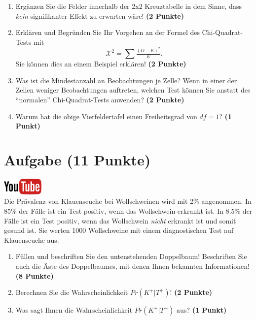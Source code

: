 \documentclass[a4paper, 10pt]{scrartcl}\usepackage[]{graphicx}\usepackage[]{xcolor}
\begin{document}
\begin{enumerate}
\item Erg{\"a}nzen Sie die Felder innerhalb der 2x2 Kreuztabelle in dem Sinne,
  dass \textit{kein} signifikanter Effekt zu erwarten w{\"a}re!
  \textbf{(2 Punkte)}
\item Erkl{\"a}ren und Begr{\"u}nden Sie Ihr Vorgehen an der Formel des
  Chi-Quadrat-Tests mit
  \begin{equation*}
  \mathcal{X}^2 = \sum\tfrac{(O - E)^2}{E}.  
  \end{equation*}
  Sie k{\"o}nnen dies an einem Beispiel erkl{\"a}ren! \textbf{(2 Punkte)}
\item Was ist die Mindestanzahl an Beobachtungen je Zelle? Wenn in einer
  der Zellen weniger Beobachtungen auftreten, welchen Test k{\"o}nnen Sie
  anstatt des "`normalen"' Chi-Quadrat-Tests anwenden? \textbf{(2 Punkte)}
\item Warum hat die obige Vierfeldertafel einen Freiheitsgrad von $df=1$?
  \textbf{(1 Punkt)}
\end{enumerate} 
\clearpage

\section{Aufgabe \hfill (11 Punkte)}

\hfill\href{https://youtu.be/VQlNl8hvRII}{\includegraphics[width =
  2cm]{img/youtube}}\\[1Ex]


Die Pr{\"a}valenz von Klauenseuche bei Wollschweinen wird mit
2\% angenommen. In 85\% der F{\"a}lle ist ein Test positiv, wenn das Wollschwein erkrankt
ist. In 8.5\% der F{\"a}lle ist ein Test positiv,
wenn das Wollschwein \textit{nicht} erkrankt ist und somit gesund ist. Sie
werten 1000 Wollschweine mit einem
diagnostischen Test auf Klauenseuche aus.



\begin{enumerate}
\item F{\"u}llen und beschriften Sie den untenstehenden Doppelbaum! Beschriften
  Sie auch die {\"A}ste des Doppelbaumes, mit denen Ihnen bekannten
  Informationen!  \textbf{(8 Punkte)}
\item Berechnen Sie die Wahrscheinlichkeit $Pr(K^+|T^+)$! \textbf{(2 Punkte)}
\item Was sagt Ihnen die Wahrscheinlichkeit $Pr(K^+|T^+)$ aus? \textbf{(1 Punkt)}
\end{enumerate}
\end{document}
